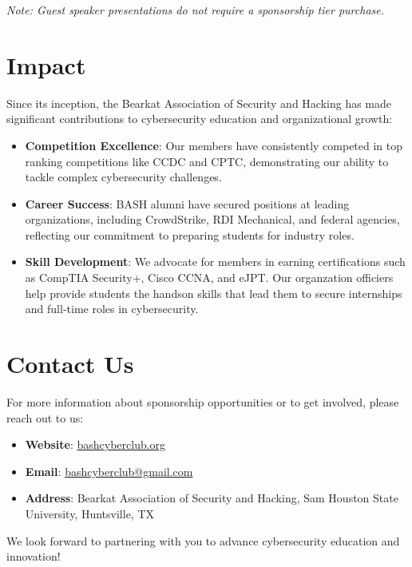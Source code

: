 \documentclass[11pt,letterpaper]{article}
\begin{document}
\textit{Note: Guest speaker presentations do not require a sponsorship tier purchase.}

\section*{Impact}
Since its inception, the Bearkat Association of Security and Hacking has made significant contributions to cybersecurity education and organizational growth:

\begin{itemize}
    \item \textbf{Competition Excellence}: Our members have consistently competed in top ranking competitions like C\-C\-D\-C and C\-P\-T\-C\@, demonstrating our ability to tackle complex cybersecurity challenges.
    \item \textbf{Career Success}: BASH alumni have secured positions at leading organizations, including CrowdStrike, RDI Mechanical, and federal agencies, reflecting our commitment to preparing students for industry roles.
    \item \textbf{Skill Development}: We advocate for members in earning certifications such as CompTIA Security+, Cisco C\-C\-N\-A, and eJPT\@. Our organzation officiers help provide students the handson skills that lead them to secure internships and full-time roles in cybersecurity.
\end{itemize}

\section*{Contact Us}
For more information about sponsorship opportunities or to get involved, please reach out to us:

\begin{itemize}
    \item \textbf{Website}: \url{bashcyberclub.org}
    \item \textbf{Email}: \href{mailto:bashcyberclub@gmail.com}{bashcyberclub@gmail.com}
    \item \textbf{Address}: Bearkat Association of Security and Hacking, Sam Houston State University, Huntsville, TX
\end{itemize}

We look forward to partnering with you to advance cybersecurity education and innovation!
\end{document}

